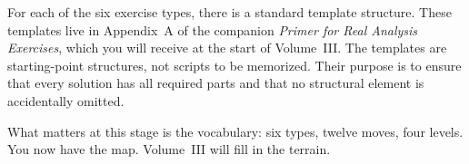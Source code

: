 \begin{remark}
For each of the six exercise types, there is a standard template
structure. These templates live in Appendix~A of the companion
\emph{Primer for Real Analysis Exercises}, which you will receive
at the start of Volume~III. The templates are starting-point
structures, not scripts to be memorized. Their purpose is to ensure
that every solution has all required parts and that no structural
element is accidentally omitted.

What matters at this stage is the vocabulary: six types, twelve moves,
four levels. You now have the map. Volume~III will fill in the terrain.
\end{remark}
